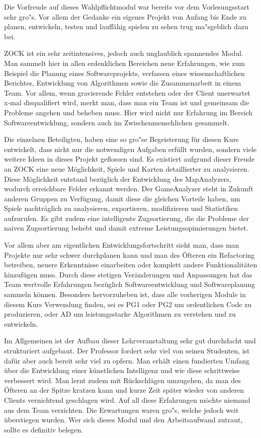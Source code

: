 Die Vorfreude auf dieses Wahlpflichtmodul war bereits vor dem Vorlesungsstart sehr gro"s.
Vor allem der Gedanke ein eigenes Projekt von Anfang bis Ende zu planen, entwickeln, testen und lauff\"ahig spielen zu sehen trug ma"sgeblich dazu bei.

ZOCK ist ein sehr zeitintensives, jedoch auch unglaublich spannendes Modul.
Man sammelt hier in allen erdenklichen Bereichen neue Erfahrungen, wie zum Beispiel die Planung eines Softwareprojekts, verfassen eines wissenschaftlichen Berichtes, Entwicklung von Algorithmen sowie die Zusammenarbeit in einem Team.
Vor allem, wenn gravierende Fehler entstehen oder der Client unerwartet x-mal disqualifiert wird, merkt man, dass man ein Team ist und gemeinsam die Probleme angehen und beheben muss.
Hier wird nicht nur Erfahrung im Bereich Softwareentwicklung, sondern auch im Zwischenmenschlichen gesammelt.

Die einzelnen Beteiligten, haben eine so gro"se Begeisterung f\"ur diesen Kurs entwickelt, dass nicht nur die notwendigen Aufgaben erf\"ullt wurden, sondern viele weitere Ideen in dieses Projekt geflossen sind.
Es existiert aufgrund dieser Freude an ZOCK eine neue M\"oglichkeit, Spiele und Karten detaillierter zu analysieren.
Diese M\"oglichkeit entstand bez\"uglich der Entwicklung des MapAnalyzers, wodurch erreichbare Felder erkannt werden.
Der GameAnalyzer steht in Zukunft anderen Gruppen zu Verf\"ugung, damit diese die gleichen Vorteile haben, um Spiele nachtr\"aglich zu analysieren, exportieren, modifizieren und Statistiken aufzurufen.
Es gibt zudem eine intelligente Zugsortierung, die die Probleme der naiven Zugsortierung behebt und damit extreme Leistungsopimierungen bietet.

Vor allem aber am eigentlichen Entwicklungsfortschritt sieht man, dass man Projekte nur sehr schwer durchplanen kann und man des \"Ofteren ein Refactoring betreiben, neuere Erkenntnisse einarbeiten oder komplett andere Funktionalit\"aten hinzuf\"ugen muss.
Durch diese stetigen Ver\"anderungen und Anpassungen hat das Team wertvolle Erfahrungen bez\"uglich Softwareentwicklung und Softwareplanung sammeln k\"onnen.
Besonders hervorzuheben ist, dass alle vorherigen Module in diesem Kurs Verwendung finden, sei es PG1 oder PG2 um ordentlichen Code zu produzieren, oder AD um leistungsstarke Algorithmen zu verstehen und zu entwickeln.

Im Allgemeinen ist der Aufbau dieser Lehrveranstaltung sehr gut durchdacht und strukturiert aufgebaut.
Der Professor fordert sehr viel von seinen Studenten, ist daf\"ur aber auch bereit sehr viel zu opfern.
Man erh\"alt einen fundierten Umfang \"uber die Entwicklung einer k\"unstlichen Intelligenz und wie diese schrittweise verbessert wird.
Man lernt zudem mit R\"uckschl\"agen umzugehen, da man des \"Ofteren an der Spitze kratzen kann und kurze Zeit sp\"ater wieder von anderen Clients vernichtend geschlagen wird.
Auf all diese Erfahrungen m\"ochte niemand aus dem Team verzichten.
Die Erwartungen waren gro"s, welche jedoch weit \"uberstiegen wurden.
Wer sich dieses Modul und den Arbeitsaufwand zutraut, sollte es definitiv belegen.


\bigskip
\newpage
